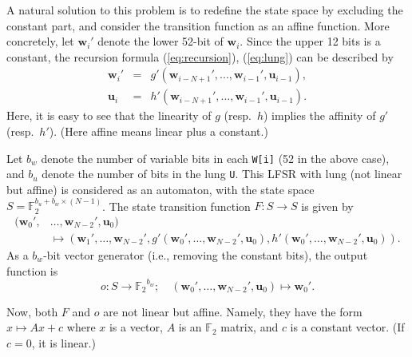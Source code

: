 \documentclass{svmult}
\begin{document}
A natural solution to this problem is to redefine
the state space by excluding the constant part,
and consider the transition function as an
affine function.
More concretely, let $\mathbf{w}_{i}'$ denote the
lower 52-bit of $\mathbf{w}_i$. Since the upper 12 bits
is a constant, the recursion
formula (\ref{eq:recursion}), (\ref{eq:lung})
can be described by
\begin{eqnarray}
  \mathbf{w}_i' &=& g'(\mathbf{w}_{i-N+1}', ..., \mathbf{w}_{i-1}',
  \mathbf{u}_{i-1}), \label{eq:recursion-dash} \\
  \mathbf{u}_i &=& h'(\mathbf{w}_{i-N+1}', ..., \mathbf{w}_{i-1}',
  \mathbf{u}_{i-1}). \label{eq:lung-dash}
\end{eqnarray}
Here, it is easy to see that the linearity of $g$ (resp.\ $h$)
implies the affinity of $g'$ (resp.\ $h'$). (Here affine means
linear plus a constant.)

Let $b_w$ denote the number of variable bits
in each \texttt{W[i]} (52 in the above case),
and $b_u$ denote the number of bits in the
lung \texttt{U}.
This LFSR with lung (not linear but affine)
is considered as an automaton, with the state space
$S={\mathbb F}_2^{b_u + b_w \times (N-1)}$.
The state transition function $F: S \to S$ is given by
\begin{equation*}
  \begin{split}
    (\mathbf{w}_0', &\ldots,\mathbf{w}_{N-2}', \mathbf{u}_0) \\
    &\mapsto
    (\mathbf{w}_1',\ldots,\mathbf{w}_{N-2}',
    g'(\mathbf{w}_0',\ldots,\mathbf{w}_{N-2}', \mathbf{u}_0),
    h'(\mathbf{w}_0',\ldots,\mathbf{w}_{N-2}', \mathbf{u}_0)).
  \end{split}
\end{equation*}
As a $b_w$-bit vector generator (i.e., removing
the constant bits), the output function is
\[
  o: S \to {{\mathbb F}_2}^{b_w}; \quad
  (\mathbf{w}_0', \ldots, \mathbf{w}_{N-2}', \mathbf{u}_0)
  \mapsto \mathbf{w}_0'.
\]

Now, both $F$ and $o$ are not linear
but affine. Namely, they have the form
$x \mapsto Ax+c$ where $x$ is a vector, $A$ is an
$\mathbb{F}_2$ matrix, and $c$ is a constant vector.
(If $c=0$, it is linear.)

\end{document}
